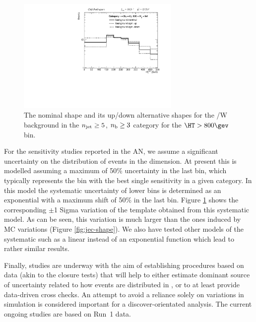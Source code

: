 \begin{figure}[]
  \centering
  \includegraphics[width=0.7\textwidth]{figures/mhtShapeSyst/MHTShapeSyst_ge3b_ge5j_800_Inf.pdf}
  \caption{\label{fig:mht-shape-syst-toy} 
    The nominal \mht shape and its up/down alternative shapes for the \ttbar/W background in the $n_{\text{jet}} \geq5$, $n_{\text{b}} \geq 3$
    category for the $\HT > 800 \gev$ bin.
  }
\end{figure}

For the sensitivity studies reported in the AN, we assume a significant 
uncertainty on the distribution of events in the \mht dimension. 
At present this is modelled assuming a maximum of 50\% uncertainty in the last \mht bin, 
which typically represents the bin with the best single sensitivity in a given \scalht category. 
In this model the systematic uncertainty of lower \mht bins is determined 
as an exponential with a maximum shift of 50\% in the last \mht bin. 
Figure \ref{fig:mht-shape-syst-toy} shows the corresponding $\pm$1 Sigma variation of the 
\mht template obtained from this systematic model. 
As can be seen, this variation is much larger than the ones induced by MC variations (Figure \ref{fig:jec-shape}).  
We also have tested other models of the \mht systematic such as a linear instead of an exponential function which lead to rather similar results. 

Finally, studies are underway with the aim of establishing procedures
based on data (akin to the closure tests) that will help to either
estimate dominant source of uncertainty related to how events are
distributed in \mht, or to at least provide data-driven cross checks.
An attempt to avoid a reliance solely on variations in simulation is
considered important for a discover-orientated analysis. The current
ongoing studies are based on Run~1 data.

%
%

